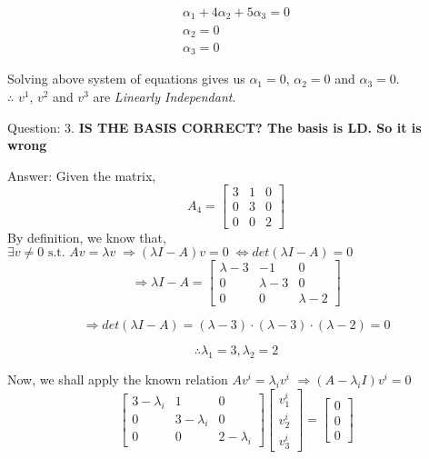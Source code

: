 \documentclass[a4paper]{article}
\begin{document}
\begin{qalist}
			\begin{align}
				{\alpha}_{1} + 4{\alpha}_{2} + 5{\alpha}_{3} = 0 \\
				{\alpha}_{2} = 0 \\
				{\alpha}_{3} = 0
			\end{align}
			
			Solving above system of equations gives us ${\alpha}_{1} = 0$, ${\alpha}_{2} = 0$ and ${\alpha}_{3} = 0$. \\
			$\therefore$ ${v}^{1}$, ${v}^{2}$ and ${v}^{3}$ are \textit{Linearly Independant}.
		
			
		\item[Question: 3.] \setcounter{equation}{0} \textbf{IS THE BASIS CORRECT? The basis is LD. So it is wrong}
		\item[Answer:] Given the matrix, 
			\begin{equation}
				{A}_{4} = \begin{bmatrix} 3 & 1 & 0 \\ 0 & 3 & 0 \\ 0 & 0 & 2\end{bmatrix}
			\end{equation}
			By definition, we know that, $\exists v \neq 0 \text{ s.t. } Av = \lambda v \; \Rightarrow (\lambda I - A) v = 0 \; \Leftrightarrow det(\lambda I - A) = 0$ 
			\begin{equation}
				\Rightarrow \lambda I - A = \begin{bmatrix}\lambda-3 & -1 & 0 \\ 0 & \lambda - 3 & 0 \\ 0 & 0 & \lambda -2\end{bmatrix}
			\end{equation}
			
			\begin{equation}
				\Rightarrow det(\lambda I - A) = (\lambda - 3)\cdot(\lambda - 3)\cdot(\lambda - 2) = 0
			\end{equation}
			
			\begin{equation}
				\therefore {\lambda}_{1} = 3, {\lambda}_{2} = 2
			\end{equation}			
			
			Now, we shall apply the known relation $A{v}^{i} = {\lambda}_{i}{v}^{i}$ $\Rightarrow (A - {\lambda}_{i}I){v}^{i} = 0$ 
			\begin{equation}\label{eq:q3eigVecEqn}
				\begin{bmatrix}3 - {\lambda}_{i} & 1 & 0 \\ 0 & 3 - {\lambda}_{i} & 0 \\ 0 & 0 & 2 - {\lambda}_{i}\end{bmatrix} 
				\begin{bmatrix}{v}^{i}_{1} \\ {v}^{i}_{2} \\ {v}^{i}_{3}\end{bmatrix} = 
				\begin{bmatrix}0 \\ 0 \\ 0\end{bmatrix}
			\end{equation}
			

\end{qalist}
\end{document}
